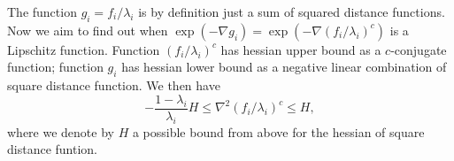 

The function $g_i = f_i / \lambda_i $ is by definition just a sum of squared distance functions.
Now we aim to find out when \( \exp(- \nabla g_i ) = \exp(- \nabla (f_i / \lambda_i)^c) \) is a Lipschitz function.
Function $(f_i / \lambda_i)^c$ has hessian upper bound as a $c$-conjugate function;
function $g_i$ has hessian lower bound as a negative linear combination of square distance function.
We then have
\begin{equation}
	\label{equa:hessian_bound_f}
	-\frac{1-\lambda_i}{\lambda_i} H \leq \nabla^2 (f_i / \lambda_i)^c \leq H,
\end{equation}
where we denote by $H$ a possible bound from above for the hessian of square distance funtion.

